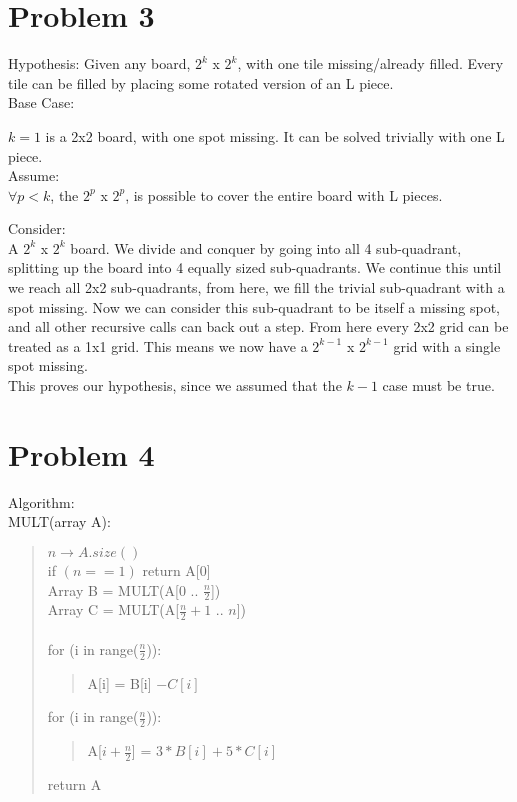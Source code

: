 \documentclass[11pt,letter]{article}
\newcommand{\2}{\{0, 1\}}
\newcommand{\1}{\mathds{1}}
\theoremstyle{definition}
\begin{document}

\section*{Problem 3}
Hypothesis: Given any board, $2^k$ x  $2^k$, with one tile missing/already filled. Every tile can be filled by placing some rotated version of an L piece.\\

Base Case:

$k=1$ is a 2x2 board, with one spot missing. It can be solved trivially with one L piece.\\

Assume:\\

$\forall p < k$, the $2^p$ x  $2^p$, is possible to cover the entire board with L pieces.

Consider: \\

A $2^k$ x  $2^k$ board. We divide and conquer by going into all 4 sub-quadrant, splitting up the board into 4 equally sized sub-quadrants. We continue this until we reach all 2x2 sub-quadrants, from here, we fill the trivial sub-quadrant with a spot missing. Now we can consider this sub-quadrant to be itself a missing spot, and all other recursive calls can back out a step. From here every 2x2 grid can be treated as a 1x1 grid. This means we now have a $2^{k-1}$ x  $2^{k-1}$ grid with a single spot missing. \\
This proves our hypothesis, since we assumed that the $k-1$ case must be true.

\section*{Problem 4}

Algorithm:\\
MULT(array A):
\begin{quote}
	$n \rightarrow A.size()$\\
	if $(n == 1)$ return A[0]\\
	Array B = MULT(A[0 .. $\frac{n}{2}$])\\
	Array C = MULT(A[$\frac{n}{2} + 1$ .. $n$])\\\\
	
	for (i in range($\frac{n}{2}$)):
	\begin{quote}
		A[i] = B[i] $-C[i]$
	\end{quote}
	
	for (i in range($\frac{n}{2}$)):
	\begin{quote}
		A[$i + \frac{n}{2}$] = $3 * B[i] + 5 * C[i]$
	\end{quote}
	return A
\end{quote}
\end{document}
